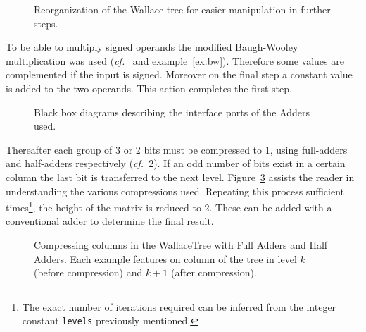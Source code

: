 \begin{figure}[H]
\centering
{}\quad
{}
\caption{Reorganization of the Wallace tree for easier manipulation in further steps.}
\label{fig:wt_reorganization}
\end{figure}

To be able to multiply signed operands the modified Baugh-Wooley multiplication was used (\emph{cf.}~\cite{part3} and example~\ref{ex:bw}). Therefore some values are complemented if the input is signed. Moreover on the final step a constant value is added to the two operands.
This action completes the first step.

\begin{figure}[H]
\centering
{}\quad
{}
\caption{Black box diagrams describing the interface ports of the Adders used.}
\label{fig:adders_dia}
\end{figure}


Thereafter each group of 3 or 2 bits must be compressed to 1, using full-adders and half-adders respectively (\emph{cf.}~\ref{fig:adders_dia}). If an odd number of bits exist in a certain column the last bit is transferred to the next level. Figure~\ref{fig:wt_compression} assists the reader in understanding the various compressions used. Repeating this process sufficient times\footnote{The exact number of iterations required can be inferred from the integer constant \texttt{levels} previously mentioned.}, the height of the matrix is reduced to 2. These can be added with a conventional adder to determine the final result.

\begin{figure}[H]
\centering
{}\quad
{}\quad
{}
\caption{Compressing columns in the WallaceTree with Full Adders and Half Adders. Each example features on column of the tree in level $k$ (before compression) and $k+1$ (after compression).}
\label{fig:wt_compression}
\end{figure}



